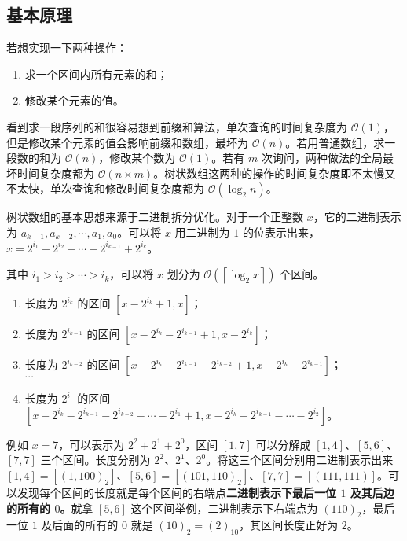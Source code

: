 
\subsection{基本原理}

若想实现一下两种操作：
\begin{enumerate}
\item 求一个区间内所有元素的和；
\item 修改某个元素的值。
\end{enumerate}

看到求一段序列的和很容易想到前缀和算法，单次查询的时间复杂度为 $\mathcal{O}(1)$，但是修改某个元素的值会影响前缀和数组，最坏为 $\mathcal{O}(n)$。若用普通数组，求一段数的和为 $\mathcal{O}(n)$，修改某个数为 $\mathcal{O}(1)$。若有 $m$ 次询问，两种做法的全局最坏时间复杂度都为 $\mathcal{O}(n \times m)$。树状数组这两种的操作的时间复杂度即不太慢又不太快，单次查询和修改时间复杂度都为 $\mathcal{O}(\log_2 n)$。

树状数组的基本思想来源于二进制拆分优化。对于一个正整数 $x$，它的二进制表示为 $a_{k - 1}, a_{k - 2}, \cdots , a_1, a_0$。可以将 $x$ 用二进制为 $1$ 的位表示出来，$x = 2^{i_1} + 2^{i_2} + \cdots + 2^{i_{k - 1}} + 2^{i_k}$。

其中 $i_1 > i_2 > \cdots > i_k$，可以将 $x$ 划分为 $\mathcal{O}(\left\lceil \log_2 x \right\rceil)$ 个区间。

\begin{enumerate}
\item 长度为 $2^{i_k}$ 的区间 $[x - 2^{i_k} + 1 , x]$；
\item 长度为 $2^{i_{k - 1}}$ 的区间 $[x - 2^{i_k} - 2^{i_{k - 1}} + 1, x - 2^{i_k}]$；
\item 长度为 $2^{i_{k - 2}}$ 的区间 $[x - 2^{i_k} - 2^{i_{k - 1}} -2^{i_{k - 2}} + 1, x - 2^{i_k} - 2^{i_{k - 1}}]$； \\
$\cdots$
\item 长度为 $2^{i_{1}}$ 的区间 $[x - 2^{i_k} - 2^{i_{k - 1}} -2^{i_{k - 2}} - \cdots -2^{i_1} + 1, x - 2^{i_k} - 2^{i_{k - 1}} - \cdots - 2^{i_2}]$。
\end{enumerate}

例如 $x = 7$，可以表示为 $2^2+2^1+2^0$，区间 $[1, 7]$ 可以分解成 $[1, 4]$、$[5, 6]$、$[7, 7]$ 三个区间。长度分别为 $2^2$、$2^1$、$2^0$。将这三个区间分别用二进制表示出来 $[1, 4] = [(1, 100)_2]$、$[5, 6] = [(101, 110)_2]$、$[7, 7] = [(111, 111)]$。可以发现每个区间的长度就是每个区间的右端点\textbf{二进制表示下最后一位 $1$ 及其后边的所有的 $0$。}就拿 $[5, 6]$ 这个区间举例，二进制表示下右端点为 $(110)_2$，最后一位 $1$ 及后面的所有的 $0$ 就是 $(10)_2 = (2)_{10}$，其区间长度正好为 $2$。

